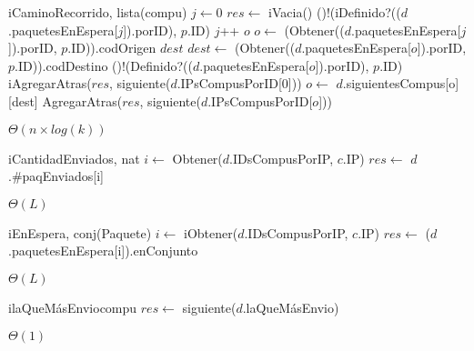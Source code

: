\begin{Algoritmos}
  \begin{algoritmo}{iCaminoRecorrido}{, }{lista(compu)}
     $j \gets 0$
    $res \gets$ iVacia()
    \While(){!(iDefinido?(($d$.paquetesEnEspera[$j$]).porID), $p$.ID)}{
      $j$++
    }
     $o$
    $o \gets$ (Obtener(($d$.paquetesEnEspera[$j$]).porID, $p$.ID)).codOrigen
     $dest$
    $dest \gets$ (Obtener(($d$.paquetesEnEspera[$o$]).porID, $p$.ID)).codDestino
    \While(){!(Definido?(($d$.paquetesEnEspera[$o$]).porID), $p$.ID)}{
      iAgregarAtras($res$, siguiente($d$.IPsCompusPorID[0]))
      $o \gets$ $d$.siguientesCompus[o][dest]
    }
    AgregarAtras($res$, siguiente($d$.IPsCompusPorID[$o$]))
  \end{algoritmo} 
  \datosAlgoritmo{} %
  {} %
  {} %
  {$\Theta(n \times log(k))$} %
  {} %

  \begin{algoritmo}{iCantidadEnviados}{, }{nat}
     $i \gets$ Obtener($d$.IDsCompusPorIP, $c$.IP)
    $res \gets$ $d$.\#paqEnviados[i]
  \end{algoritmo}
 \datosAlgoritmo{} %
  {} %
  {} %
  {$\Theta(L)$} %
  {} %

  \begin{algoritmo}{iEnEspera}{, }{conj(Paquete)}
     $i \gets$ iObtener($d$.IDsCompusPorIP, $c$.IP)
    $res \gets$ ($d$.paquetesEnEspera[i]).enConjunto
  \end{algoritmo}
 \datosAlgoritmo{} %
  {} %
  {} %
  {$\Theta(L)$} %
  {} %

  \begin{algoritmo}{ilaQueM\'{a}sEnvio}{}{compu}
    $res \gets$ siguiente($d$.laQueM\'{a}sEnvio)
  \end{algoritmo}
  \datosAlgoritmo{} %
  {} %
  {} %
  {$\Theta(1)$} %
  {} %


\end{Algoritmos}
